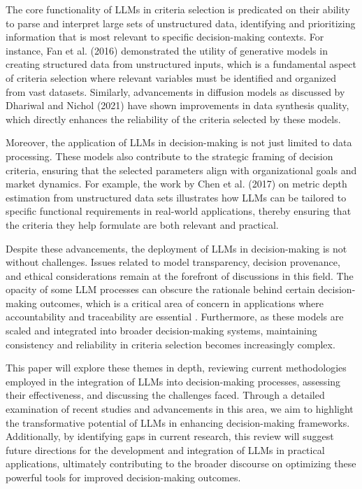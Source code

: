\documentclass[conference]{IEEEtran}
\begin{document}
The core functionality of LLMs in criteria selection is predicated on their ability to parse and interpret large sets of unstructured data, identifying and prioritizing information that is most relevant to specific decision-making contexts. For instance, Fan et al. (2016) demonstrated the utility of generative models in creating structured data from unstructured inputs, which is a fundamental aspect of criteria selection where relevant variables must be identified and organized from vast datasets. Similarly, advancements in diffusion models as discussed by Dhariwal and Nichol (2021) have shown improvements in data synthesis quality, which directly enhances the reliability of the criteria selected by these models.

Moreover, the application of LLMs in decision-making is not just limited to data processing. These models also contribute to the strategic framing of decision criteria, ensuring that the selected parameters align with organizational goals and market dynamics. For example, the work by Chen et al. (2017) on metric depth estimation from unstructured data sets illustrates how LLMs can be tailored to specific functional requirements in real-world applications, thereby ensuring that the criteria they help formulate are both relevant and practical.

Despite these advancements, the deployment of LLMs in decision-making is not without challenges. Issues related to model transparency, decision provenance, and ethical considerations remain at the forefront of discussions in this field. The opacity of some LLM processes can obscure the rationale behind certain decision-making outcomes, which is a critical area of concern in applications where accountability and traceability are essential \cite{huang2018}. Furthermore, as these models are scaled and integrated into broader decision-making systems, maintaining consistency and reliability in criteria selection becomes increasingly complex.

This paper will explore these themes in depth, reviewing current methodologies employed in the integration of LLMs into decision-making processes, assessing their effectiveness, and discussing the challenges faced. Through a detailed examination of recent studies and advancements in this area, we aim to highlight the transformative potential of LLMs in enhancing decision-making frameworks. Additionally, by identifying gaps in current research, this review will suggest future directions for the development and integration of LLMs in practical applications, ultimately contributing to the broader discourse on optimizing these powerful tools for improved decision-making outcomes.
\end{document}
